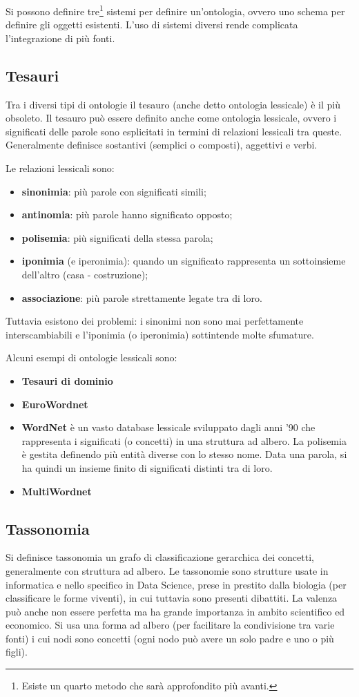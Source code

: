 \documentclass[11pt]{article}
\begin{document}
Si possono definire tre\footnote{Esiste un quarto metodo che sarà approfondito più avanti.} sistemi per definire un'ontologia, ovvero uno schema per definire gli oggetti esistenti. L'uso di sistemi diversi rende complicata l'integrazione di più fonti.

\subsection{Tesauri}
Tra i diversi tipi di ontologie il tesauro (anche detto ontologia lessicale) è il più obsoleto. Il tesauro può essere definito anche come ontologia lessicale, ovvero i significati delle parole sono esplicitati in termini di relazioni lessicali tra queste.
Generalmente definisce sostantivi (semplici o composti), aggettivi e verbi.

Le relazioni lessicali sono:
\begin{itemize}
  \item \textbf{sinonimia}: più parole con significati simili;
  \item \textbf{antinomia}: più parole hanno significato opposto;
  \item \textbf{polisemia}: più significati della stessa parola;
  \item \textbf{iponimia} (e iperonimia): quando un significato rappresenta un sottoinsieme dell'altro (casa - costruzione);
  \item \textbf{associazione}: più parole strettamente legate tra di loro.
\end{itemize}
Tuttavia esistono dei problemi: i sinonimi non sono mai perfettamente interscambiabili e l'iponimia (o iperonimia) sottintende molte sfumature.

Alcuni esempi di ontologie lessicali sono:
\begin{itemize}
\item \textbf{Tesauri di dominio}
\item \textbf{EuroWordnet}
\item \textbf{WordNet} è un vasto database lessicale sviluppato dagli anni '90 che rappresenta i significati (o concetti) in una struttura ad albero. La polisemia è gestita definendo più entità diverse con lo stesso nome. Data una parola, si ha quindi un insieme finito di significati distinti tra di loro.
\item \textbf{MultiWordnet}
\end{itemize}
\subsection{Tassonomia}
Si definisce tassonomia un grafo di classificazione gerarchica dei concetti, generalmente con struttura ad albero.
Le tassonomie sono strutture usate in informatica e nello specifico in Data Science, prese in prestito dalla biologia (per classificare le forme viventi), in cui tuttavia sono presenti dibattiti.
La valenza può anche non essere perfetta ma ha grande importanza in ambito scientifico ed economico.
Si usa una forma ad albero (per facilitare la condivisione tra varie fonti) i cui nodi sono concetti (ogni nodo può avere un solo padre e uno o più figli).
\end{document}
